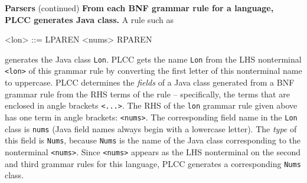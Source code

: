 \begin{minipage}[t]{\sw}
\slidenumber
\LARGE
{\bf Parsers} (continued)\exx
\emm\LightBox{\MYlon}\exx
{\bf From each BNF grammar rule for a language,
PLCC generates Java class.}
A rule such as
\begin{qv}
<lon> ::= LPAREN <nums> RPAREN
\end{qv}
generates the Java class \verb'Lon'.
PLCC gets the name \verb'Lon'
from the LHS nonterminal \verb'<lon>' of this grammar rule
by converting the first letter of this nonterminal name to uppercase.\exx
PLCC determines the {\em fields}
of a Java class generated from a BNF grammar rule
from the RHS terms of the rule --
specifically, the terms that are enclosed in angle brackets \verb'<...>'.
The RHS of the \verb'lon' grammar rule given above
has one term in angle brackets:
\verb'<nums>'.
The corresponding field name in the \verb'Lon' class
is \verb'nums' (Java field names always begin with a lowercase letter).
The {\em type} of this field is \verb'Nums',
because \verb'Nums' is the name of the Java class corresponding
to the nonterminal \verb'<nums>'.\exx
Since \verb'<nums>' appears as the LHS nonterminal
on the second and third grammar rules for this language,
PLCC generates a corresponding \verb'Nums' class.
\end{minipage}
\clearpage
